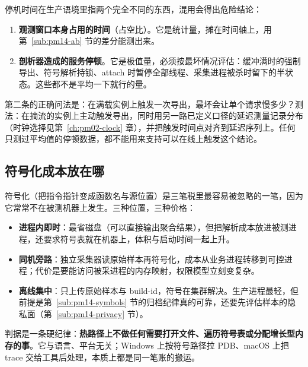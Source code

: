 \documentclass[12pt,a4paper,fontset=fandol]{ctexbook}
\begin{document}
停机时间在生产语境里指两个完全不同的东西，混用会得出危险结论：

\begin{enumerate}
  \item \textbf{观测窗口本身占用的时间}（占空比）。它是统计量，摊在时间轴上，用第~\ref{sub:pm14-ab} 节的差分能测出来。
  \item \textbf{剖析器造成的服务停顿}。它是极值量，必须按最坏情况评估：缓冲满时的强制导出、符号解析持锁、attach 时暂停全部线程、采集进程被杀时留下的半状态。这些都不是平均一下就行的量。
\end{enumerate}

第二条的正确问法是：在满载实例上触发一次导出，最坏会让单个请求慢多少？测法：在摘流的实例上主动触发导出，同时用另一路已定义口径的延迟测量记录分布（时钟选择见第~\ref{ch:pm02-clock} 章），并把触发时间点对齐到延迟序列上。任何只测过平均值的停顿数据，都不能用来支持可以在线上触发这个结论。

\subsection{符号化成本放在哪}
\label{sub:pm14-symbolize}

符号化（把指令指针变成函数名与源位置）是三笔税里最容易被忽略的一笔，因为它常常不在被测机器上发生。三种位置，三种价格：

\begin{itemize}
  \item \textbf{进程内即时}：最省磁盘（可以直接输出聚合结果），但把解析成本放进被测进程，还要求符号表就在机器上，体积与启动时间一起上升。
  \item \textbf{同机旁路}：独立采集器读原始样本再符号化，成本从业务进程转移到可控进程；代价是要能访问被采进程的内存映射，权限模型立刻变复杂。
  \item \textbf{离线集中}：只上传原始样本与 build-id，符号在集群解决。生产进程最轻，但前提是第~\ref{sub:pm14-symbols} 节的归档纪律真的可靠，还要先评估样本的隐私面（第~\ref{sub:pm14-privacy} 节）。
\end{itemize}

判据是一条硬纪律：\textbf{热路径上不做任何需要打开文件、遍历符号表或分配增长型内存的事}。它与语言、平台无关；Windows 上按符号路径拉 PDB、macOS 上把 trace 交给工具后处理，本质上都是同一笔账的搬运。
\end{document}
